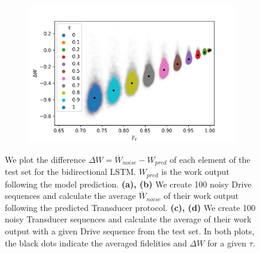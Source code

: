 \begin{figure}
\begin{subfigure}{0.4\textwidth}
	\end{subfigure}
	\begin{subfigure}{0.4\textwidth}
		\centering
		\includegraphics[width=\textwidth]{img/noisy_trans_dt_1}
	\end{subfigure}
	\caption{We plot the difference $\Delta W = \overline{W}_{noise} - W_{pred}$ of each element of the test set for the bidirectional LSTM. $W_{pred}$ is the work output following the model prediction. \textbf{(a), (b)} We create 100 noisy Drive sequences and calculate the average $\overline{W}_{noise}$ of their work output following the predicted Transducer protocol. \textbf{(c), (d)} We create 100 noisy Transducer sequences and calculate the average of their work output with a given Drive sequence from the test set. In both plots, the black dots indicate the averaged fidelities and $\Delta W$ for a given $\tau$.}
	\label{noisedt5}
\end{figure}